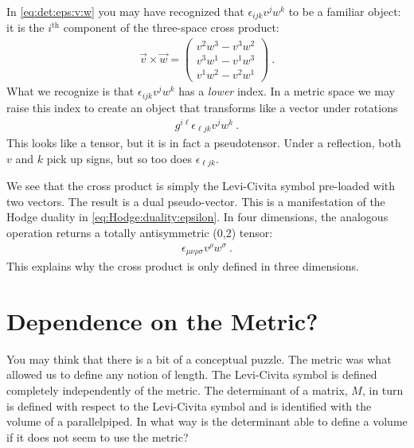 In \eqref{eq:det:eps:v:w} you may have recognized that $\epsilon_{ijk}v^j w^k$ to be a familiar object: it is the $i^\text{th}$ component of the three-space cross product:
\begin{align}
    \vec{v}\times \vec{w} = 
    \begin{pmatrix}
        v^2w^3 - v^3w^2 \\
        v^3 w^1 - v^1w^3 \\
        v^1 w^2 - v^2 w^1
    \end{pmatrix}
    \ .
\end{align}
What we recognize is that $\epsilon_{ijk}v^j w^k$ has a \emph{lower} index. In a metric space we may raise this index to create an object that transforms like a vector under rotations
\begin{align}
    g^{i\ell}\epsilon_{\ell j k}v^j w^k \ .
\end{align}
This looks like a tensor, but it is in fact a pseudotensor. Under a reflection, both $v$ and $k$ pick up signs, but so too does $\epsilon_{\ell j k}$. 

We see that the cross product is simply the Levi-Civita symbol pre-loaded with two vectors. The result is a dual pseudo-vector. This is a manifestation of the Hodge duality in \eqref{eq:Hodge:duality:epsilon}. In four dimensions, the analogous operation returns a totally antisymmetric (0,2) tensor:
\begin{align}
    \epsilon_{\mu\nu\rho\sigma}v^\rho w^\sigma \ .
\end{align}
This explains why the cross product is only defined in three dimensions. 


\section{Dependence on the Metric?}

You may think that there is a bit of a conceptual puzzle. The metric was what allowed us to define any notion of length. The Levi-Civita symbol is defined completely independently of the metric. The determinant of a matrix, $M$, in turn is defined with respect to the Levi-Civita symbol and is identified with the volume of a parallelpiped. In what way is the determinant able to define a volume if it does not seem to use the metric? 

